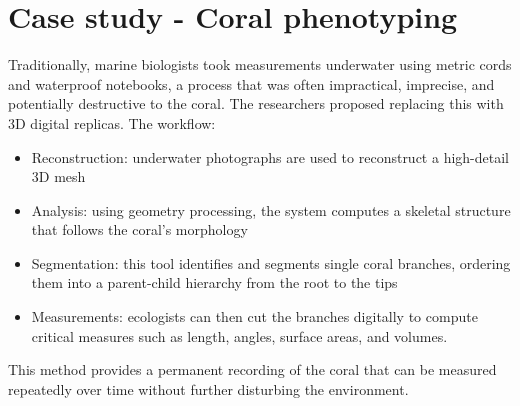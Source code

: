 \section{Case study - Coral phenotyping}
Traditionally, marine biologists took measurements underwater using metric cords and waterproof notebooks, a process that was often impractical, imprecise, and potentially destructive to the coral. The researchers proposed replacing this with 3D digital replicas. The workflow:
\begin{itemize}[noitemsep]
    \item Reconstruction: underwater photographs are used to reconstruct a high-detail 3D mesh
    \item Analysis: using geometry processing, the system computes a skeletal structure that follows the coral's morphology
    \item Segmentation: this tool identifies and segments single coral branches, ordering them into a parent-child hierarchy from the root to the tips
    \item Measurements: ecologists can then cut the branches digitally to compute critical measures such as length, angles, surface areas, and volumes.
\end{itemize}

This method provides a permanent recording of the coral that can be measured repeatedly over time without further disturbing the environment.